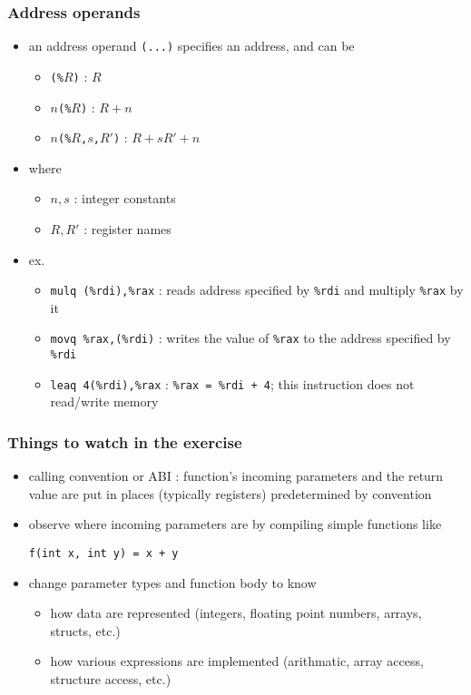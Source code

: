 \documentclass[12pt,dvipdfmx]{beamer}
\newcommand{\ao}[1]{{\color{blue}#1}}
\begin{document}
\begin{frame}
  \frametitle{Address operands}
  \begin{itemize}
  \item an address operand {\tt (...)} specifies an address,
    and can be
    \begin{itemize}
    \item \ao{\tt(\%$R$)} : $R$
    \item \ao{$n${\tt (\%$R$)}} : $R + n$
    \item \ao{$n${\tt (\%$R$,$s$,$R'$)}} : $R + s R' + n$
    \end{itemize}
  \item where
    \begin{itemize}
    \item $n, s$ : integer constants
    \item $R, R'$ : register names
    \end{itemize}
  \item ex.
    \begin{itemize}
    \item \ao{\tt mulq (\%rdi),\%rax} : reads address specified by {\tt \%rdi} and multiply {\tt \%rax} by it
    \item \ao{\tt movq \%rax,(\%rdi)} : writes the value of {\tt \%rax} to the address specified by {\tt \%rdi}
    \item \ao{\tt leaq 4(\%rdi),\%rax} : {\tt \%rax = \%rdi + 4}; this instruction does not read/write memory
    \end{itemize}
  \end{itemize}
\end{frame}

\begin{frame}[fragile]
  \frametitle{Things to watch in the exercise}
  \begin{itemize}
  \item calling convention or ABI :
    function's incoming parameters and the return value
    are put in places (typically registers)
    predetermined by convention
  \item observe where incoming parameters are by compiling simple functions like
\begin{lstlisting}
f(int x, int y) = x + y      
\end{lstlisting}
\item change parameter types and function body to know
  \begin{itemize}
  \item how data are represented (integers, floating point numbers, arrays, structs, etc.)
  \item how various expressions are implemented
    (arithmatic, array access, structure access, etc.) 
  \end{itemize}
\end{itemize}
\end{frame}
\end{document}
